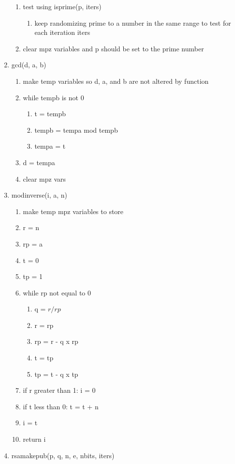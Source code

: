 \documentclass[11pt]{article}
\begin{document}
\begin{enumerate}
\begin{enumerate}
	\item test using isprime(p, iters)
		\begin{enumerate}
		\item keep randomizing prime to a number in the same range to test for each iteration iters
		\end{enumerate}
	\item clear mpz variables and p should be set to the prime number
	\end{enumerate}
\item gcd(d, a, b)
	\begin{enumerate}
	\item make temp variables so d, a, and b are not altered by function
	\item while tempb is not 0
		\begin{enumerate}
		\item t = tempb
		\item tempb = tempa mod tempb
		\item tempa = t
		\end{enumerate}
	\item d = tempa
	\item clear mpz vars
	\end{enumerate}
\item modinverse(i, a, n)
	\begin{enumerate}
	\item make temp mpz variables to store 
	\item r = n
	\item rp = a
	\item t = 0
	\item tp = 1
	\item while rp not equal to 0
		\begin{enumerate}
		\item q = \(r/rp\)
		\item r = rp
		\item rp = r - q x rp
		\item t = tp
		\item tp = t - q x tp
		\end{enumerate}
	\item if r greater than 1: i = 0
	\item if t less than 0: t = t + n
	\item i = t
	\item return i
	\end{enumerate}
\item rsamakepub(p, q, n, e, nbits, iters)
	\begin{enumerate}

\end{enumerate}
\end{enumerate}
\end{document}
